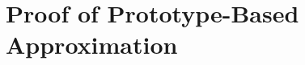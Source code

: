 \documentclass[11pt]{article}
\begin{document}



\section{Proof of Prototype-Based Approximation}
\label{app:prototype_approximation}
\label{app:orf_accuracy}
\end{document}
